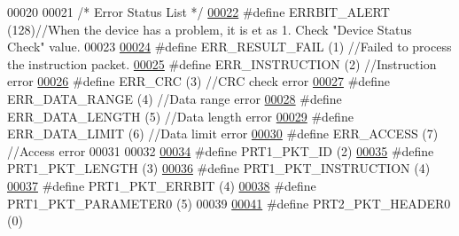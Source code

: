 \begin{DoxyCode}
00020 
00021 \textcolor{comment}{/* Error Status List */}
\hypertarget{dynamixel_8h_source_l00022}{}\hyperlink{dynamixel_8h_ab779f3983333a0e6dd9ac22db085f085}{00022} \textcolor{preprocessor}{#define ERRBIT\_ALERT        (128)//When the device has a problem, it is et as 1. Check "Device Status
       Check" value.}
00023 
\hypertarget{dynamixel_8h_source_l00024}{}\hyperlink{dynamixel_8h_a03c05ff8bd55f2fcbccea7cbcc27f631}{00024} \textcolor{preprocessor}{#define ERR\_RESULT\_FAIL     (1)  //Failed to process the instruction packet.}
\hypertarget{dynamixel_8h_source_l00025}{}\hyperlink{dynamixel_8h_aa91884b8935522bb2a399344af15219e}{00025} \textcolor{preprocessor}{#define ERR\_INSTRUCTION     (2)  //Instruction error}
\hypertarget{dynamixel_8h_source_l00026}{}\hyperlink{dynamixel_8h_ae2f8372efd8fbf20128240c45f597109}{00026} \textcolor{preprocessor}{#define ERR\_CRC             (3)  //CRC check error}
\hypertarget{dynamixel_8h_source_l00027}{}\hyperlink{dynamixel_8h_a9911d2e939402bec893f45c505509f0b}{00027} \textcolor{preprocessor}{#define ERR\_DATA\_RANGE      (4)  //Data range error}
\hypertarget{dynamixel_8h_source_l00028}{}\hyperlink{dynamixel_8h_ae0f1b1095721c3f135fdcc9df2bf5646}{00028} \textcolor{preprocessor}{#define ERR\_DATA\_LENGTH     (5)  //Data length error}
\hypertarget{dynamixel_8h_source_l00029}{}\hyperlink{dynamixel_8h_a6c295332e1aa0a5a634876922cd80add}{00029} \textcolor{preprocessor}{#define ERR\_DATA\_LIMIT      (6)  //Data limit error}
\hypertarget{dynamixel_8h_source_l00030}{}\hyperlink{dynamixel_8h_aed4705155f092e9afb386c82efcba242}{00030} \textcolor{preprocessor}{#define ERR\_ACCESS          (7)  //Access error}
00031 
00032 
\hypertarget{dynamixel_8h_source_l00034}{}\hyperlink{dynamixel_8h_a3c2bb339c587abadd977eb2f14daeff9}{00034} \textcolor{preprocessor}{#define PRT1\_PKT\_ID                 (2)}
\hypertarget{dynamixel_8h_source_l00035}{}\hyperlink{dynamixel_8h_ab24601f91d0364e4b62edad3c2a0a5c4}{00035} \textcolor{preprocessor}{#define PRT1\_PKT\_LENGTH             (3)}
\hypertarget{dynamixel_8h_source_l00036}{}\hyperlink{dynamixel_8h_a3da1d083c018994fb0c859f4e06e1f78}{00036} \textcolor{preprocessor}{#define PRT1\_PKT\_INSTRUCTION        (4)}
\hypertarget{dynamixel_8h_source_l00037}{}\hyperlink{dynamixel_8h_a582837a5f6ad93ee1dbb82ba51691edf}{00037} \textcolor{preprocessor}{#define PRT1\_PKT\_ERRBIT             (4)}
\hypertarget{dynamixel_8h_source_l00038}{}\hyperlink{dynamixel_8h_a939ef836d0605d2f4f9372df3ea0855f}{00038} \textcolor{preprocessor}{#define PRT1\_PKT\_PARAMETER0         (5)}
00039 
\hypertarget{dynamixel_8h_source_l00041}{}\hyperlink{dynamixel_8h_ab65834fcbbcf4701f1f4569d664ccdda}{00041} \textcolor{preprocessor}{#define PRT2\_PKT\_HEADER0                (0)}

\end{DoxyCode}
